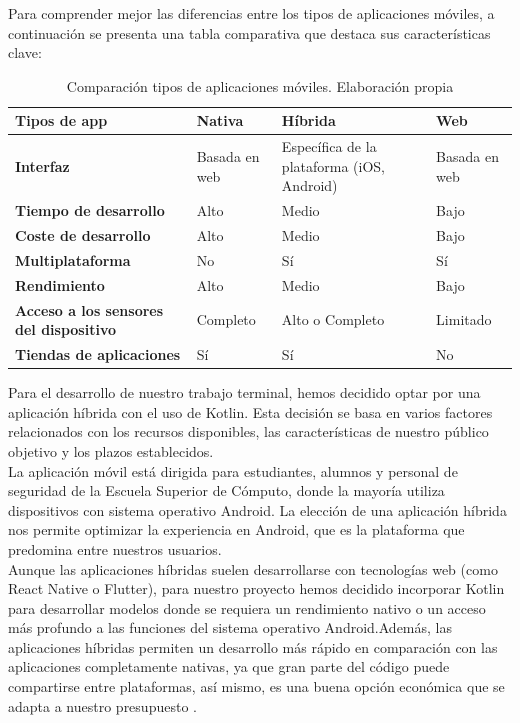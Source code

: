 Para comprender mejor las diferencias entre los tipos de aplicaciones móviles, a continuación se presenta una tabla comparativa que destaca sus características clave:
\newpage

\begin{table}[h!]
	\centering
	\begin{tabular}{|p{4cm}|p{2cm}|p{2cm}|p{2cm}|}
		\hline
		\textbf{Tipos de app} & \textbf{Nativa} & \textbf{Híbrida} & \textbf{Web} \\ \hline
		\textbf{Interfaz} & Basada en web & Específica de la plataforma (iOS, Android) & Basada en web \\ \hline
		\textbf{Tiempo de desarrollo} & Alto & Medio & Bajo \\ \hline
		\textbf{Coste de desarrollo} & Alto & Medio & Bajo \\ \hline
		\textbf{Multiplataforma} & No & Sí & Sí \\ \hline
		\textbf{Rendimiento} & Alto & Medio & Bajo \\ \hline
		\textbf{Acceso a los sensores del dispositivo} & Completo & Alto o Completo & Limitado \\ \hline
		\textbf{Tiendas de aplicaciones} & Sí & Sí & No \\ \hline
	\end{tabular}
	\caption{Comparación tipos de aplicaciones móviles. Elaboración propia}
	\label{tab:tipos_apps}
\end{table}

Para el desarrollo de nuestro trabajo terminal, hemos decidido optar por una aplicación híbrida con el uso de Kotlin. Esta decisión se basa en varios factores relacionados con los recursos disponibles, las características de nuestro público objetivo y los plazos establecidos. \\

La aplicación móvil está dirigida para estudiantes, alumnos y personal de seguridad de la Escuela Superior de Cómputo, donde la mayoría utiliza dispositivos con sistema operativo Android. La elección de una aplicación híbrida nos permite optimizar  la experiencia en Android, que es la plataforma que predomina entre nuestros usuarios. \\

Aunque las aplicaciones híbridas suelen desarrollarse con tecnologías web (como React Native o Flutter), para nuestro proyecto hemos decidido incorporar Kotlin para desarrollar modelos donde se requiera un rendimiento nativo o un acceso más profundo a las funciones del sistema operativo Android.Además, las aplicaciones híbridas permiten un desarrollo más rápido en comparación con las aplicaciones completamente nativas, ya que gran parte del código puede compartirse entre plataformas, así mismo, es una buena opción económica que se adapta a nuestro presupuesto \cite{IM1}. 

